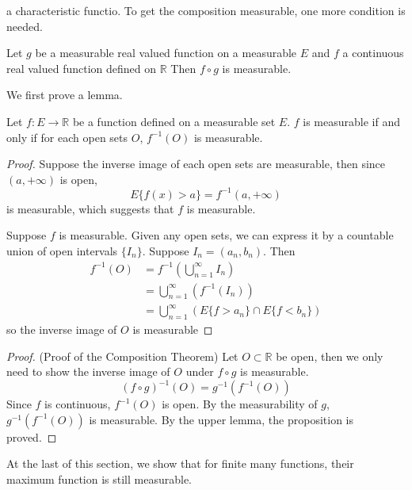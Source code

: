 \documentclass[lang=en, 12pt]{elegantbook}
\newcommand{\RR}{\mathbb{R}}
\begin{document}
        a characteristic functio. To get the composition measurable, one more condition is needed.
            \begin{theorem}[Composition]
                Let $g$ be a measurable real valued function on a measurable $E$ and $f$ a continuous real valued function defined on $\RR$ 
            Then $f \circ g$ is measurable. 
            \end{theorem}
            We first prove a lemma.
            \begin{lemma}
                Let $f:E \to \RR$ be a function defined on a measurable set $E$. $f$ is measurable if and only if for each open sets $O$,
            $f^{-1}(O)$ is measurable.
            \end{lemma}
            \begin{proof}
                Suppose the inverse image of each open sets are measurable, then since $(a, +\infty)$ is open,
                $$E\{f(x)>a\} = f^{-1}(a,+\infty)$$ 
            is measurable, which suggests that $f$ is measurable.\par
                Suppose $f$ is measurable. Given any open sets, we can express it by a countable union of open intervals $\{I_n\}$.
            Suppose $I_n = (a_n, b_n)$. Then
            \begin{equation*}
                \begin{aligned}
                    f^{-1}(O) &= f^{-1}(\bigcup_{n=1}^{\infty} I_n)\\
                    &= \bigcup_{n=1}^{\infty} (f^{-1}(I_n))\\
                    &= \bigcup_{n=1}^{\infty} (E\{f>a_n\} \cap E\{f< b_n\})
                \end{aligned}
            \end{equation*}
            so the inverse image of $O$ is measurable 
            \end{proof}
            \begin{proof} (Proof of the Composition Theorem)
                Let $O \subset \RR$ be open, then we only need to show the inverse image of $O$ under $f \circ g$ is measurable. 
                $$(f \circ g )^{-1}(O) = g^{-1} (f^{-1}(O))$$
                Since $f$ is continuous, $f^{-1}(O)$ is open. By the measurability of $g$, $g^{-1}(f^{-1}(O))$ is measurable. By the 
            upper lemma, the proposition is proved.
            \end{proof}
            At the last of this section, we show that for finite many functions, their maximum function is still measurable.
\end{document}
